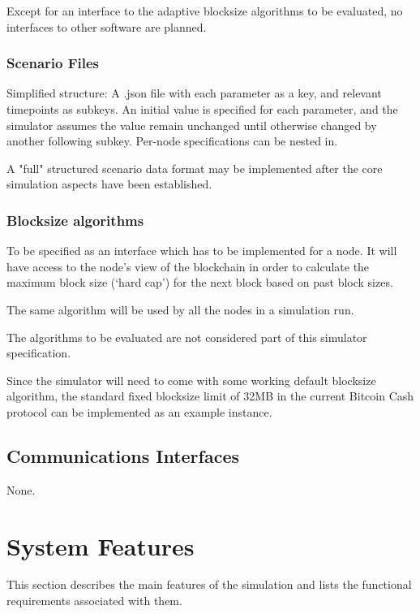 \documentclass{scrreprt}
\begin{document}
    Except for an interface to the adaptive blocksize algorithms to be
    evaluated, no interfaces to other software are planned.

    \subsection{Scenario Files}

      Simplified structure: A .json file with each parameter as a key, and
      relevant timepoints as subkeys.
      An initial value is specified for each parameter, and the simulator
      assumes the value remain unchanged until otherwise changed by another
      following subkey.
      Per-node specifications can be nested in.

      A "full" structured scenario data format may be implemented after the
      core simulation aspects have been established.

    \subsection{Blocksize algorithms}

      To be specified as an interface which has to be implemented for a node.
      It will have access to the node's view of the blockchain in order to
      calculate the maximum block size (`hard cap') for the next block
      based on past block sizes.

      The same algorithm will be used by all the nodes in a simulation run.

      The algorithms to be evaluated are not considered part of this simulator
      specification.

      Since the simulator will need to come with some working default blocksize
      algorithm, the standard fixed blocksize limit of 32MB in the current
      Bitcoin Cash protocol can be implemented as an example instance.

  \section{Communications Interfaces}

    None.

\chapter{System Features}

  This section describes the main features of the simulation and lists the
  functional requirements associated with them.
\end{document}
